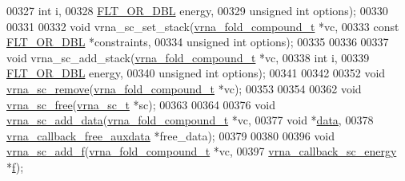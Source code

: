\begin{DoxyCode}
00327                     \textcolor{keywordtype}{int}                   i,
00328                     \hyperlink{group__data__structures_ga31125aeace516926bf7f251f759b6126}{FLT\_OR\_DBL}            energy,
00329                     \textcolor{keywordtype}{unsigned} \textcolor{keywordtype}{int}          options);
00330 
00331 
00332 \textcolor{keywordtype}{void} vrna\_sc\_set\_stack(\hyperlink{group__fold__compound_structvrna__fc__s}{vrna\_fold\_compound\_t} *vc,
00333                        \textcolor{keyword}{const} \hyperlink{group__data__structures_ga31125aeace516926bf7f251f759b6126}{FLT\_OR\_DBL}     *constraints,
00334                        \textcolor{keywordtype}{unsigned} \textcolor{keywordtype}{int}         options);
00335 
00336 
00337 \textcolor{keywordtype}{void} vrna\_sc\_add\_stack(\hyperlink{group__fold__compound_structvrna__fc__s}{vrna\_fold\_compound\_t} *vc,
00338                        \textcolor{keywordtype}{int}                  i,
00339                        \hyperlink{group__data__structures_ga31125aeace516926bf7f251f759b6126}{FLT\_OR\_DBL}           energy,
00340                        \textcolor{keywordtype}{unsigned} \textcolor{keywordtype}{int}         options);
00341 
00342 
00352 \textcolor{keywordtype}{void} \hyperlink{group__soft__constraints_ga73cdc07b9a199c614367bebef0f2c41a}{vrna\_sc\_remove}(\hyperlink{group__fold__compound_structvrna__fc__s}{vrna\_fold\_compound\_t} *vc);
00353 
00354 
00362 \textcolor{keywordtype}{void} \hyperlink{group__soft__constraints_ga6d55446448d69346fc313b993c4fb3e8}{vrna\_sc\_free}(\hyperlink{group__soft__constraints_structvrna__sc__s}{vrna\_sc\_t} *sc);
00363 
00364 
00376 \textcolor{keywordtype}{void} \hyperlink{group__soft__constraints_ga15c6d52471ec97897e2bb7f964f5deb6}{vrna\_sc\_add\_data}(\hyperlink{group__fold__compound_structvrna__fc__s}{vrna\_fold\_compound\_t}        *vc,
00377                       \textcolor{keywordtype}{void}                        *\hyperlink{group__soft__constraints_a7574680143df97b9029146c2150bf06d}{data},
00378                       \hyperlink{group__fold__compound_ga7806651f51b195013839a218b3bbd5a3}{vrna\_callback\_free\_auxdata}  *free\_data);
00379 
00380 
00396 \textcolor{keywordtype}{void} \hyperlink{group__soft__constraints_ga8c7d907ec0125cd61c04e0908010a4e9}{vrna\_sc\_add\_f}(\hyperlink{group__fold__compound_structvrna__fc__s}{vrna\_fold\_compound\_t}     *vc,
00397                    \hyperlink{group__soft__constraints_ga88a266695d9e25cc12114dceb7b4565e}{vrna\_callback\_sc\_energy}  *\hyperlink{group__soft__constraints_a32dc86090237888c75491bbd4861a04b}{f});

\end{DoxyCode}
